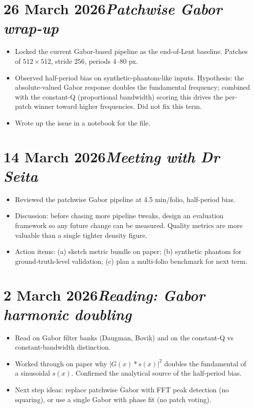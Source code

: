 \documentclass[11pt,a4paper]{article}
\newcommand{\logentry}[2]{\section*{#1\hfill\normalfont\normalsize\textit{#2}}}
\begin{document}

\logentry{26 March 2026}{Patchwise Gabor wrap-up}
\begin{itemize}
  \item Locked the current Gabor-based pipeline as the end-of-Lent baseline. Patches of $512 \times 512$, stride $256$, periods $4$--$80$ px.
  \item Observed half-period bias on synthetic-phantom-like inputs. Hypothesis: the absolute-valued Gabor response doubles the fundamental frequency; combined with the constant-Q (proportional bandwidth) scoring this drives the per-patch winner toward higher frequencies. Did not fix this term.
  \item Wrote up the issue in a notebook for the file.
\end{itemize}

\logentry{14 March 2026}{Meeting with Dr Seita}
\begin{itemize}
  \item Reviewed the patchwise Gabor pipeline at 4.5 min/folio, half-period bias.
  \item Discussion: before chasing more pipeline tweaks, design an evaluation framework so any future change can be measured. Quality metrics are more valuable than a single tighter density figure.
  \item Action items: (a) sketch metric bundle on paper; (b) synthetic phantom for ground-truth-level validation; (c) plan a multi-folio benchmark for next term.
\end{itemize}

\logentry{2 March 2026}{Reading: Gabor harmonic doubling}
\begin{itemize}
  \item Read on Gabor filter banks (Daugman, Bovik) and on the constant-Q vs constant-bandwidth distinction.
  \item Worked through on paper why $|G(x) \ast s(x)|^2$ doubles the fundamental of a sinusoidal $s(x)$. Confirmed the analytical source of the half-period bias.
  \item Next step ideas: replace patchwise Gabor with FFT peak detection (no squaring), or use a single Gabor with phase fit (no patch voting).
\end{itemize}

\end{document}
